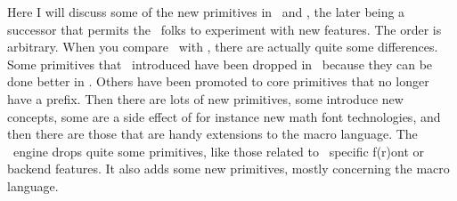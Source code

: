 


\startdocument[title=Primitives]

\startsubject[title=Contents]
    \setups[sectioncontents]
\stopsubject

\pushoverloadmode

\startsection[title={Introduction}]

Here I will discuss some of the new primitives in \LUATEX\ and \LUAMETATEX, the
later being a successor that permits the \CONTEXT\ folks to experiment with new
features. The order is arbitrary. When you compare \LUATEX\ with \PDFTEX, there
are actually quite some differences. Some primitives that \PDFTEX\ introduced
have been dropped in \LUATEX\ because they can be done better in \LUA. Others
have been promoted to core primitives that no longer have a  prefix.
Then there are lots of new primitives, some introduce new concepts, some are a
side effect of for instance new math font technologies, and then there are those
that are handy extensions to the macro language. The \LUAMETATEX\ engine drops
quite some primitives, like those related to \PDFTEX\ specific f(r)ont or backend
features. It also adds some new primitives, mostly concerning the macro language.

